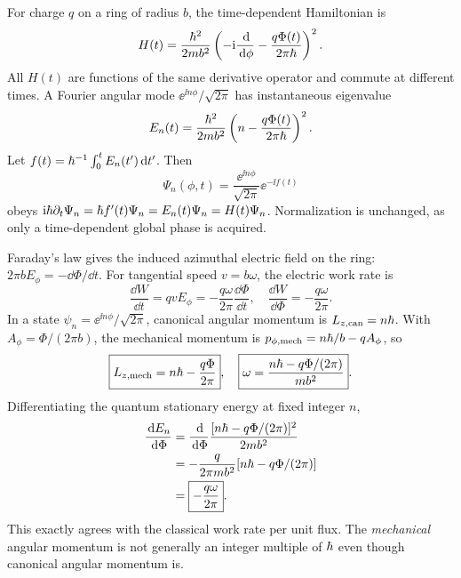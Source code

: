 For charge $q$ on a ring of radius $b$,
the time-dependent Hamiltonian is
\begin{equation}
H(t)=\frac{\hbar^2}{2mb^2}
\left(-\mathrm i\frac{\,\mathrm d}{\,\mathrm d\phi}
-\frac{q\Phi(t)}{2\pi\hbar}\right)^2.
\end{equation}
All $H(t)$ are functions of the
same derivative operator and commute
at different times. A Fourier angular
mode $\ee^{\ii n\phi}/\sqrt{2\pi}$
has instantaneous eigenvalue
\begin{equation}
E_n(t)=\frac{\hbar^2}{2mb^2}
\left(n-\frac{q\Phi(t)}{2\pi\hbar}\right)^2.
\end{equation}
Let $f(t)=\hbar^{-1}\int_0^tE_n(t')\,\mathrm d t'$.
Then
\begin{equation}
\boxed{\Psi_n(\phi,t)=
\frac{\ee^{\ii n\phi}}{\sqrt{2\pi}}
\ee^{-\ii f(t)}}
\end{equation}
obeys
$\mathrm i\hbar\partial_t\Psi_n=
\hbar f'(t)\Psi_n=E_n(t)\Psi_n=H(t)\Psi_n$.
Normalization is unchanged, as only
a time-dependent global phase is acquired.

Faraday's law gives the induced azimuthal
electric field on the ring:
$2\pi bE_\phi=-\dd\Phi/\dd t$.
For tangential speed $v=b\omega$,
the electric work rate is
\begin{equation}
\frac{\dd W}{\dd t}=qvE_\phi
=-\frac{q\omega}{2\pi}\frac{\dd\Phi}{\dd t},
\quad\boxed{\frac{\dd W}{\dd\Phi}
=-\frac{q\omega}{2\pi}}.
\end{equation}
In a state $\psi_n=\ee^{\ii n\phi}/\sqrt{2\pi}$,
canonical angular momentum is
$L_{z,\mathrm{can}}=n\hbar$.
With $A_\phi=\Phi/(2\pi b)$, the
mechanical momentum is
$p_{\phi,\mathrm{mech}}=n\hbar/b-qA_\phi$,
so
\begin{equation}
\boxed{L_{z,\mathrm{mech}}=
n\hbar-\frac{q\Phi}{2\pi}},
\quad
\boxed{\omega=\frac{n\hbar-q\Phi/(2\pi)}{mb^2}}.
\end{equation}
Differentiating the quantum stationary
energy at fixed integer $n$,
\begin{align}
\frac{\,\mathrm d E_n}{\,\mathrm d\Phi}
&=\frac{\,\mathrm d}{\,\mathrm d\Phi}
\frac{[n\hbar-q\Phi/(2\pi)]^2}{2mb^2}\\
&=-\frac{q}{2\pi mb^2}
[n\hbar-q\Phi/(2\pi)]\\
&=\boxed{-\frac{q\omega}{2\pi}}.
\end{align}
This exactly agrees with the
classical work rate per unit flux.
The \emph{mechanical} angular momentum
is not generally an integer multiple
of $\hbar$ even though canonical
angular momentum is.

